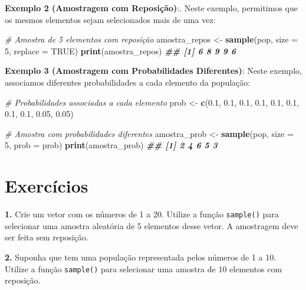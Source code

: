 \documentclass[
]{book}
\newenvironment{Shaded}{\begin{snugshade}}{\end{snugshade}}
\newcommand{\AttributeTok}[1]{\textcolor[rgb]{0.13,0.29,0.53}{#1}}
\newcommand{\CommentTok}[1]{\textcolor[rgb]{0.56,0.35,0.01}{\textit{#1}}}
\newcommand{\ConstantTok}[1]{\textcolor[rgb]{0.56,0.35,0.01}{#1}}
\newcommand{\DecValTok}[1]{\textcolor[rgb]{0.00,0.00,0.81}{#1}}
\newcommand{\DocumentationTok}[1]{\textcolor[rgb]{0.56,0.35,0.01}{\textbf{\textit{#1}}}}
\newcommand{\FloatTok}[1]{\textcolor[rgb]{0.00,0.00,0.81}{#1}}
\newcommand{\FunctionTok}[1]{\textcolor[rgb]{0.13,0.29,0.53}{\textbf{#1}}}
\newcommand{\NormalTok}[1]{#1}
\newcommand{\OtherTok}[1]{\textcolor[rgb]{0.56,0.35,0.01}{#1}}
\begin{document}
\textbf{Exemplo 2 (Amostragem com Reposição)}:. Neste exemplo, permitimos que
os mesmos elementos sejam selecionados mais de uma vez:

\begin{Shaded}
\begin{Highlighting}[]
\CommentTok{\# Amostra de 5 elementos com reposição}
\NormalTok{amostra\_repos }\OtherTok{\textless{}{-}} \FunctionTok{sample}\NormalTok{(pop, }\AttributeTok{size =} \DecValTok{5}\NormalTok{, }\AttributeTok{replace =} \ConstantTok{TRUE}\NormalTok{)}
\FunctionTok{print}\NormalTok{(amostra\_repos)}
\DocumentationTok{\#\# [1] 6 8 9 9 6}
\end{Highlighting}
\end{Shaded}

\textbf{Exemplo 3 (Amostragem com Probabilidades Diferentes)}: Neste exemplo,
associamos diferentes probabilidades a cada elemento da população:

\begin{Shaded}
\begin{Highlighting}[]
\CommentTok{\# Probabilidades associadas a cada elemento}
\NormalTok{prob }\OtherTok{\textless{}{-}} \FunctionTok{c}\NormalTok{(}\FloatTok{0.1}\NormalTok{, }\FloatTok{0.1}\NormalTok{, }\FloatTok{0.1}\NormalTok{, }\FloatTok{0.1}\NormalTok{, }\FloatTok{0.1}\NormalTok{, }\FloatTok{0.1}\NormalTok{, }\FloatTok{0.1}\NormalTok{, }\FloatTok{0.1}\NormalTok{, }\FloatTok{0.05}\NormalTok{, }\FloatTok{0.05}\NormalTok{)}

\CommentTok{\# Amostra com probabilidades diferentes}
\NormalTok{amostra\_prob }\OtherTok{\textless{}{-}} \FunctionTok{sample}\NormalTok{(pop, }\AttributeTok{size =} \DecValTok{5}\NormalTok{, }\AttributeTok{prob =}\NormalTok{ prob)}
\FunctionTok{print}\NormalTok{(amostra\_prob)}
\DocumentationTok{\#\# [1] 2 4 6 5 3}
\end{Highlighting}
\end{Shaded}

\section{Exercícios}\label{exercuxedcios-19}

\textbf{1.} Crie um vetor com os números de 1 a 20. Utilize a função
\texttt{sample()} para selecionar uma amostra aleatória de 5 elementos desse
vetor. A amostragem deve ser feita sem reposição.

\textbf{2.} Suponha que tem uma população representada pelos números de 1 a
10. Utilize a função \texttt{sample()} para selecionar uma amostra de 10
elementos com reposição.
\end{document}
